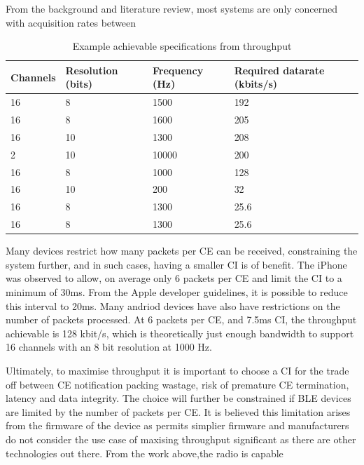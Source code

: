 \documentclass[]{article}
\begin{document}
From the background and literature review, most systems are only concerned with acquisition rates between 

\begin{table}[H]
\centering
\caption{Example achievable specifications from throughput}
\label{fig:sensors}
\begin{tabular}{|p{1.1in}|p{1.1in}|p{1.1in}|p{1.1in}|} \hline 
\textbf{Channels} & \textbf{Resolution (bits)} & \textbf{Frequency (Hz)} & \textbf{Required datarate (kbits/s)} \\ \hline 
16 & 8 & 1500 & 192 \\ \hline  
16 & 8 & 1600 & 205 \\ \hline
16 & 10 & 1300 & 208 \\ \hline  
2 & 10 & 10000 & 200  \\ \hline  
16 & 8 & 1000 & 128 \\ \hline  
16 & 10 & 200 & 32 \\ \hline  
16 & 8 & 1300 & 25.6 \\ \hline  
16 & 8 & 1300 & 25.6 \\ \hline  

\end{tabular}
\end{table}




 Many devices restrict how many packets per \ac{CE} can be received, constraining the system further, and in such cases, having a smaller \ac{CI} is of benefit. The iPhone was observed to allow, on average only 6 packets per \ac{CE} and limit the \ac{CI} to a minimum of 30ms. From the Apple developer guidelines, it is possible to reduce this interval to 20ms. Many andriod devices have also have restrictions on the number of packets processed. At 6 packets per \ac{CE}, and 7.5ms \ac{CI}, the throughput achievable is 128 kbit/s, which is theoretically just enough bandwidth to support 16 channels with an 8 bit resolution at 1000 Hz.

Ultimately, to maximise throughput it is important to choose a \ac{CI} for the trade off between \ac{CE} notification packing wastage, risk of premature \ac{CE} termination, latency and data integrity. The choice will further be constrained if \ac{BLE} devices are limited by the number of packets per \ac{CE}. It is believed this limitation arises from the firmware of the device as permits simplier firmware and manufacturers do not consider the use case of maxising throughput significant as there are other technologies out there. From the work above,the radio is capable
\end{document}
